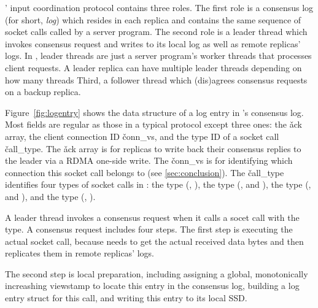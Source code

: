 
\xxx' input coordination protocol contains three roles. The first role is a 
\paxos consensus log (for short, \emph{log}) which resides in each replica and 
contains the same  sequence of socket calls called by a server program. The 
second role is a leader thread which invokes consensus request and writes to its 
local log as well as remote replicas' logs. In \xxx, leader threads are just 
a server program's worker threads that processes client requests. A leader 
replica can have multiple leader threads depending on how many threads  Third, 
a follower thread which (dis)agrees consensus requests on a backup replica.

Figure~\ref{fig:logentry} shows the data structure of a log entry in \xxx's 
consensus log. Most fields are regular as those in a typical \paxos protocol 
except three ones: the \v{ack} array, the client connection ID \v{conn\_vs}, 
and the type ID of a socket call \v{call\_type}. The \v{ack} array is for 
replicas to write back their consensus replies to the leader via a RDMA one-side 
write. The \v{conn\_vs} is for identifying which connection this socket call 
belongs to (see \ref{sec:conclusion}). The \v{call\_type} identifies four types 
of socket calls in \xxx: the \accept type (\eg, \accept), the \recv type 
(\eg, \recv and \myread), the \send type (\eg, \send and \mywrite), and the 
\close type (\eg, \close).

A leader thread invokes a consensus request when it calls a socet call with 
the \recv type. A consensus request includes four steps. The first step is 
executing the actual socket call, because \xxx needs to get the actual received 
data bytes and then replicates them in remote replicas' logs.

The second step is local preparation, including assigning a global, 
monotonically increashing viewstamp to locate this entry in the consensus log, 
building a log entry struct for this call, and writing this entry to its local 
SSD.

